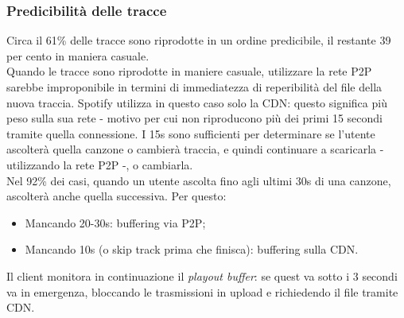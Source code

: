 \subsubsection{Predicibilità delle tracce}
Circa il 61\% delle tracce sono riprodotte in un ordine predicibile, il restante 39 per cento in maniera casuale. \\
Quando le tracce sono riprodotte in maniere casuale, utilizzare la rete P2P sarebbe improponibile in termini di immediatezza di reperibilità del file della nuova traccia. Spotify utilizza in questo caso solo la CDN: questo significa più peso sulla sua rete - motivo per cui non riproducono più dei primi 15 secondi tramite quella connessione. I 15s sono sufficienti per determinare se l'utente ascolterà quella canzone o cambierà traccia, e quindi continuare a scaricarla - utilizzando la rete P2P -, o cambiarla. \\
Nel 92\% dei casi, quando un utente ascolta fino agli ultimi 30s di una canzone, ascolterà anche quella successiva. Per questo:
\begin{itemize}
    \item Mancando 20-30s: buffering via P2P;
    \item Mancando 10s (o skip track prima che finisca): buffering sulla CDN.
\end{itemize}
Il client monitora in continuazione il \textit{playout buffer}: se quest va sotto i 3 secondi va in emergenza, bloccando le trasmissioni in upload e richiedendo il file tramite CDN.

